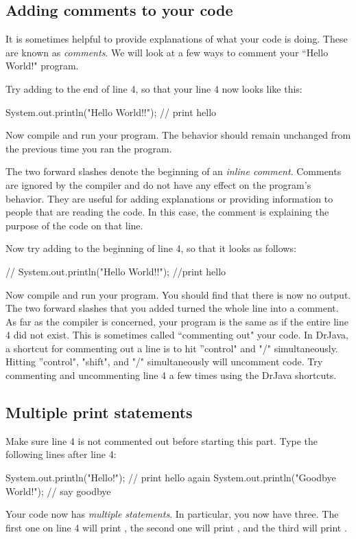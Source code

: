 \subsection{Adding comments to your code}

It is sometimes helpful to provide explanations of what your code is doing. These are known as \emph{comments}. We will look at a few ways to comment your ``Hello World!" program.

Try adding  to the end of line 4, so that your line 4 now looks like this:
\begin{code}
        System.out.println("Hello World!!"); // print hello
\end{code}

Now compile and run your program. The behavior should remain unchanged from the previous time you ran the program.

The two forward slashes \ic{//} denote the beginning of an \emph{inline comment}. Comments are ignored by the compiler and do not have any effect on the program's behavior. They are useful for adding explanations or providing information to people that are reading the code. In this case, the comment  is explaining the purpose of the code on that line.

Now try adding \ic{//} to the beginning of line 4, so that it looks as follows:
\begin{code}
//        System.out.println("Hello World!!"); //print hello
\end{code}
Now compile and run your program. You should find that there is now no output. The two forward slashes that you added turned the whole line into a comment. As far as the compiler is concerned, your program is the same as if the entire line 4 did not exist. This is sometimes called ``commenting out" your code. In DrJava, a shortcut for commenting out a line is to hit ''control" and "/" simultaneously. Hitting ''control", "shift", and "/" simultaneously will uncomment code. Try commenting and uncommenting line 4 a few times using the DrJava shortcuts. 

\subsection{Multiple print statements}

Make sure line 4 is not commented out before starting this part. Type the following lines after line 4:
\begin{code}
System.out.println("Hello!"); // print hello again System.out.println("Goodbye World!"); // say goodbye
\end{code}
Your code now has \emph{multiple statements}. In particular, you now have three. The first one on line 4 will print
, the second one will print , and the third will print .

